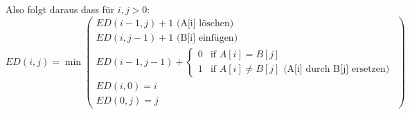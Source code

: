 \documentclass[a4paper]{article}
\begin{document}
    Also folgt daraus dass für $i, j > 0$: 
\begin{equation*}
    {ED}(i, j) = \min \left( \begin{array}{c}
    {ED}(i-1, j) + 1 \text{ (A[i] löschen)}\\
    {ED}(i, j-1) + 1 \text{ (B[i] einfügen)}\\
    {ED}(i-1, j-1) + \begin{cases}
    0 & \text{if } A[i] = B[j] \\
    1 & \text{if } A[i] \neq B[j] \text{ (A[i] durch B[j] ersetzen)}
    \end{cases} \\
    ED(i, 0) = i \\
    ED(0, j) = j
    \end{array} \right)
\end{equation*}
\end{document}
